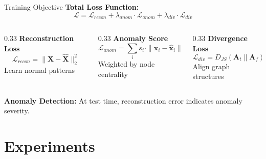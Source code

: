 \documentclass[aspectratio=169,11pt]{beamer}
\begin{document}
\begin{frame}{Training Objective}
    \textbf{Total Loss Function:}
    \begin{equation*}
        \mathcal{L} = \mathcal{L}_{recon} + \lambda_{anom} \cdot \mathcal{L}_{anom} + \lambda_{div} \cdot \mathcal{L}_{div}
    \end{equation*}

    \vspace{0.5cm}
    \begin{columns}
        \begin{column}{0.33\textwidth}
            \textbf{Reconstruction Loss}
            \begin{equation*}
                \mathcal{L}_{recon} = \|\mathbf{X} - \hat{\mathbf{X}}\|_2^2
            \end{equation*}
            Learn normal patterns
        \end{column}
        \begin{column}{0.33\textwidth}
            \textbf{Anomaly Score}
            \begin{equation*}
                \mathcal{L}_{anom} = \sum_i s_i \cdot \|\mathbf{x}_i - \hat{\mathbf{x}}_i\|
            \end{equation*}
            Weighted by node centrality
        \end{column}
        \begin{column}{0.33\textwidth}
            \textbf{Divergence Loss}
            \begin{equation*}
                \mathcal{L}_{div} = D_{JS}(\mathbf{A}_t \| \mathbf{A}_f)
            \end{equation*}
            Align graph structures
        \end{column}
    \end{columns}

    \vspace{0.5cm}
    \textbf{Anomaly Detection:} At test time, reconstruction error indicates anomaly severity.
\end{frame}

\section{Experiments}
\end{document}
